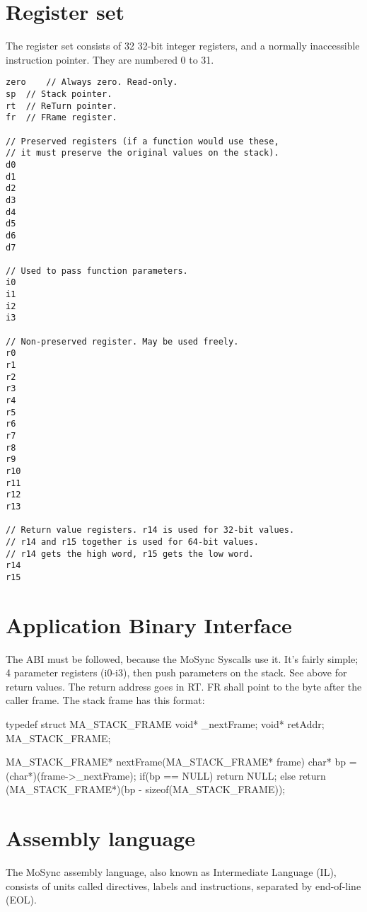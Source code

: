 \documentclass {article}
\begin{document}
\section{Register set}

The register set consists of 32 32-bit integer registers,
and a normally inaccessible instruction pointer.
They are numbered 0 to 31.

\begin{verbatim}
zero	// Always zero. Read-only.
sp	// Stack pointer.
rt	// ReTurn pointer.
fr	// FRame register.

// Preserved registers (if a function would use these,
// it must preserve the original values on the stack).
d0
d1
d2
d3
d4
d5
d6
d7

// Used to pass function parameters.
i0
i1
i2
i3

// Non-preserved register. May be used freely.
r0
r1
r2
r3
r4
r5
r6
r7
r8
r9
r10
r11
r12
r13

// Return value registers. r14 is used for 32-bit values.
// r14 and r15 together is used for 64-bit values.
// r14 gets the high word, r15 gets the low word.
r14
r15
\end{verbatim}


\section{Application Binary Interface}

The ABI must be followed, because the MoSync Syscalls use it.
It's fairly simple; 4 parameter registers (i0-i3), then push parameters on the stack.
See above for return values.
The return address goes in RT.
FR shall point to the byte after the caller frame. The stack frame has this format:

\begin{verbatimtab}
typedef struct MA_STACK_FRAME {
	void* _nextFrame;
	void* retAddr;
} MA_STACK_FRAME;

MA_STACK_FRAME* nextFrame(MA_STACK_FRAME* frame) {
	char* bp = (char*)(frame->_nextFrame);
	if(bp == NULL)
		return NULL;
	else
		return (MA_STACK_FRAME*)(bp - sizeof(MA_STACK_FRAME));
}
\end{verbatimtab}



\section{Assembly language}

The MoSync assembly language, also known as Intermediate Language (IL), consists of units called directives, labels and instructions,
separated by end-of-line (EOL).
\end{document}

